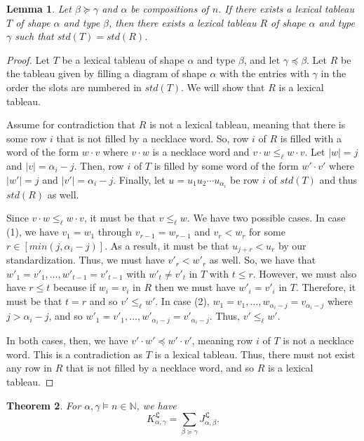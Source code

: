 \documentclass{amsart}
\newtheorem{theorem}{Theorem}[section]
\newtheorem{lemma}[theorem]{Lemma}
\theoremstyle{definition}
\newcommand{\N}{\mathbb{N}}
\newcommand{\lx}{\mathfrak{L}}
\begin{document}
\begin{lemma}\label{lem:ref_lex}
 Let $\beta \succeq \gamma$ and $\alpha$ be compositions of $n$. If there exists a lexical tableau $T$ of shape $\alpha$ and type $\beta$, then there exists a lexical tableau $R$ of shape $\alpha$ and type $\gamma$ such that $std(T)=std(R)$.
\end{lemma}
\begin{proof}
 Let $T$ be a lexical tableau of shape $\alpha$ and type $\beta$, and let $\gamma \preceq \beta$. Let $R$ be the tableau given by filling a diagram of shape $\alpha$ with the entries with $\gamma$ in the order the slots are numbered in $std(T)$. We will show that $R$ is a lexical tableau.

 Assume for contradiction that $R$ is not a lexical tableau, meaning that there is some row $i$ that is not filled by a necklace word. 
 So, row $i$ of $R$ is  filled with a word of the form $w \cdot v$ where $v \cdot w$ is a necklace word and $v \cdot w \leq_{\ell} w \cdot v$. Let $|w|=j$ and $|v| = \alpha_i-j$. Then, row $i$ of $T$ is filled by some word of the form $w' \cdot v'$ where $|w'|=j$ and $|v'|=\alpha_i - j$. Finally, let $u = u_1u_2 \cdots u_{\alpha_i}$ be row $i$ of $std(T)$ and thus $std(R)$ as well. 

 Since $v \cdot w \leq_{\ell} w \cdot v$, it must be that $v \leq_{\ell} w$. We have two possible cases. In case (1), we have $v_1 = w_1$ through $v_{r-1} = w_{r-1}$ and $v_{r} < w_{r}$ for some $r \in [min(j, \alpha_i -j)]$. As a result, it must be that $u_{j+r} < u_{r}$ by our standardization. Thus, we must have $v'_r < w'_r$ as well.
 So, we have that $w'_1 = v'_1, \ldots, w'_{t-1} = v'_{t-1}$ with $w'_{t} \not= v'_{t}$ in $T$ with $t \leq r$. However, we must also have $r \leq t$ because if $w_i = v_i$ in $R$ then we must have $w'_i = v'_i$ in $T$. Therefore, it must be that $t=r$ and so $v' \leq_{\ell} w'$. In case (2), $w_1 = v_1, \ldots, w_{\alpha_i - j} = v_{\alpha_i-j}$ where $j > \alpha_i - j$, and so $w'_1 = v'_1, \ldots, w'_{\alpha_i - j} = v'_{\alpha_i-j}$. Thus, $v' \leq_{\ell} w'$. 

 In both cases, then, we have $v' \cdot w' \preceq w' \cdot v'$, meaning row $i$ of $T$ is not a necklace word. This is a contradiction as $T$ is a lexical tableau. Thus, there must not exist any row in $R$ that is not filled by a necklace word, and so $R$ is a lexical tableau.
\end{proof}

\begin{theorem}\label{thm:K-to-J} For $\alpha, \gamma \models n \in \N$, we have 
\[ K^{\lx}_{\alpha, \gamma} = \sum_{\beta \succeq \gamma} J^{\lx}_{\alpha,\beta}.\]
\end{theorem}
\end{document}
